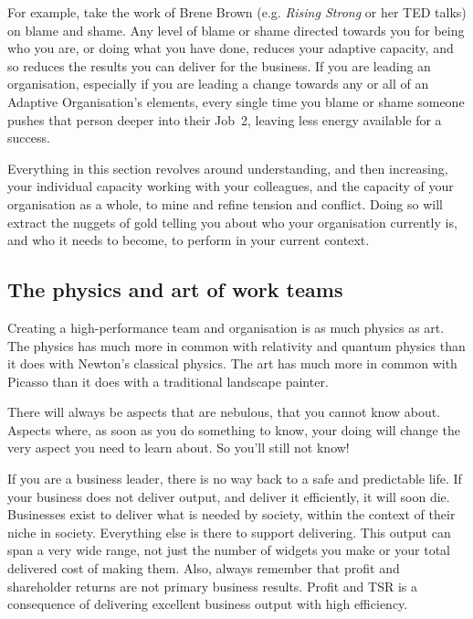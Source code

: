 For example, take the work of Brene Brown  (e.g. \emph{Rising Strong} or her TED talks) on blame and shame. Any level of blame or shame directed towards you for being who you are, or doing what you have done, reduces your adaptive capacity, and so reduces the results you can deliver for the business. If you are leading an organisation, especially if you are leading a change towards any or all of an Adaptive Organisation’s  elements, every single time you blame or shame someone pushes that person deeper into their Job~2, leaving less energy available for a success.


Everything in this section revolves around understanding, and then increasing, your individual capacity working with your colleagues, and the capacity of your organisation as a whole, to mine and refine tension and conflict. Doing so will extract the nuggets of gold telling you about who your organisation currently is, and who it needs to become, to perform in your current context.


\subsection{The physics and art of work teams}
Creating a high-performance team and organisation is as much physics as art. The physics has much more in common with relativity and quantum physics than it does with Newton's  classical physics. The art has much more in common with Picasso  than it does with a traditional landscape painter.


There will always be aspects that are nebulous, that you cannot know about. Aspects where, as soon as you do something to know, your doing will change the very aspect you need to learn about. So you'll still not know!


If you are a business leader, there is no way back to a safe and predictable life. If your business does not deliver output, and deliver it efficiently, it will soon die. Businesses exist to deliver what is needed by society, within the context of their niche in society. Everything else is there to support delivering. This output can span a very wide range, not just the number of widgets you make or your total delivered cost of making them. Also, always remember that profit and shareholder returns are not primary business results. Profit and TSR is a consequence of delivering excellent business output with high efficiency.


